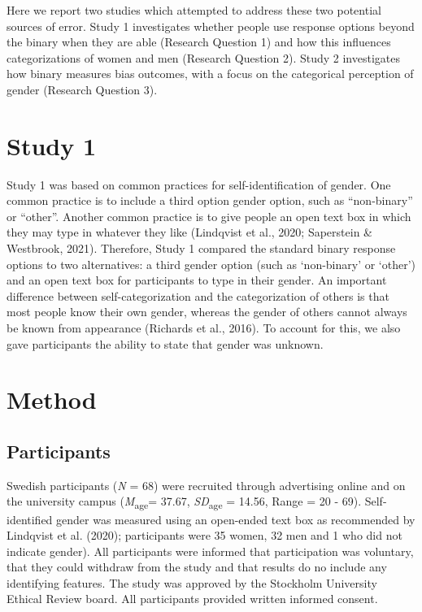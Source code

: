 \documentclass[
  man]{apa7}
\begin{document}
Here we report two studies which attempted to address these two potential sources of error. Study 1 investigates whether people use response options beyond the binary when they are able (Research Question 1) and how this influences categorizations of women and men (Research Question 2). Study 2 investigates how binary measures bias outcomes, with a focus on the categorical perception of gender (Research Question 3).

\hypertarget{study-1}{%
\section{Study 1}\label{study-1}}

Study 1 was based on common practices for self-identification of gender. One common practice is to include a third option gender option, such as ``non-binary'' or ``other''. Another common practice is to give people an open text box in which they may type in whatever they like (Lindqvist et al., 2020; Saperstein \& Westbrook, 2021). Therefore, Study 1 compared the standard binary response options to two alternatives: a third gender option (such as `non-binary' or `other') and an open text box for participants to type in their gender. An important difference between self-categorization and the categorization of others is that most people know their own gender, whereas the gender of others cannot always be known from appearance (Richards et al., 2016). To account for this, we also gave participants the ability to state that gender was unknown.

\hypertarget{method}{%
\section{Method}\label{method}}

\hypertarget{participants}{%
\subsection{Participants}\label{participants}}

Swedish participants (\emph{N} = 68) were recruited through advertising online and on the university campus (\emph{M}\textsubscript{age}= 37.67, \emph{SD}\textsubscript{age} = 14.56, Range = 20 - 69). Self-identified gender was measured using an open-ended text box as recommended by Lindqvist et al. (2020); participants were 35 women, 32 men and 1 who did not indicate gender). All participants were informed that participation was voluntary, that they could withdraw from the study and that results do no include any identifying features. The study was approved by the Stockholm University Ethical Review board. All participants provided written informed consent.
\end{document}
